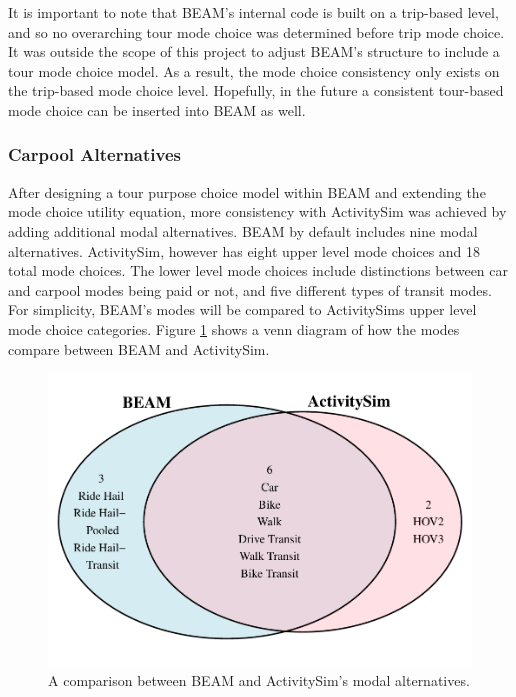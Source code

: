 \documentclass[3p, authoryear, review]{elsarticle} %
\begin{document}
It is important to note that BEAM's internal code is built on a trip-based level, and so no overarching tour mode choice was determined before trip mode choice. It was outside the scope of this project to adjust BEAM's structure to include a tour mode choice model. As a result, the mode choice consistency only exists on the trip-based mode choice level. Hopefully, in the future a consistent tour-based mode choice can be inserted into BEAM as well.

\hypertarget{pool}{%
\subsubsection{Carpool Alternatives}\label{pool}}

After designing a tour purpose choice model within BEAM and extending the mode choice utility equation, more consistency with ActivitySim was achieved by adding additional modal alternatives. BEAM by default includes nine modal alternatives. ActivitySim, however has eight upper level mode choices and 18 total mode choices. The lower level mode choices include distinctions between car and carpool modes being paid or not, and five different types of transit modes. For simplicity, BEAM's modes will be compared to ActivitySims upper level mode choice categories. Figure \ref{fig:venn} shows a venn diagram of how the modes compare between BEAM and ActivitySim.

\begin{figure}

{\centering \includegraphics{thesis_files/figure-latex/venn-1} 

}

\caption{A comparison between BEAM and ActivitySim's modal alternatives.}\label{fig:venn}
\end{figure}
\end{document}
